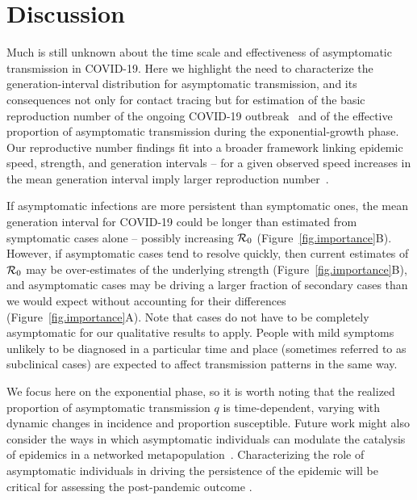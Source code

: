 \section{Discussion}

Much is still unknown about the time scale and effectiveness of asymptomatic transmission in COVID-19.
Here we highlight the need to characterize the generation-interval distribution for asymptomatic transmission, and its consequences not only for contact tracing but for estimation of the basic reproduction number of the ongoing COVID-19 outbreak~\citep{park_preprint} and of the effective proportion of asymptomatic transmission during the exponential-growth phase.
Our reproductive number findings fit into a broader framework linking epidemic speed, strength, and generation intervals -- for a given observed speed increases in the mean generation interval imply larger reproduction number~\citep{wearing2005appropriate, roberts2007model, wallinga2007generation, powers2014impact, park_2019practical}.

If asymptomatic infections are more persistent than symptomatic ones, the mean generation interval for COVID-19 could be longer than estimated from symptomatic cases alone -- possibly increasing ${\cal{R}}_0$ (Figure~\ref{fig.importance}B).
However, if asymptomatic cases tend to resolve quickly, then current estimates of ${\cal{R}}_0$ may be over-estimates of the underlying strength (Figure~\ref{fig.importance}B), and asymptomatic cases may be driving a larger fraction of secondary cases than we would expect without accounting for their differences (Figure~\ref{fig.importance}A)\DIFaddbegin {}\DIFaddend .
Note that cases do not have to be completely asymptomatic for our qualitative results to apply.
People with mild symptoms unlikely to be diagnosed in a particular time and place (sometimes referred to as subclinical cases) are expected to affect transmission patterns in the same way.

We focus here on the exponential phase, so it is worth noting that the realized proportion of asymptomatic transmission $q$ is time-dependent, varying with dynamic changes in incidence and proportion susceptible. 
Future work might also consider the ways in which asymptomatic individuals can modulate the catalysis of epidemics in a networked metapopulation~\citep{watts_pnas2005, chinazzi2020effect, du2020risk}.
Characterizing the role of asymptomatic individuals in driving the persistence of the epidemic will be critical for assessing the post-pandemic outcome \citep{lipsitch_preprint}.
